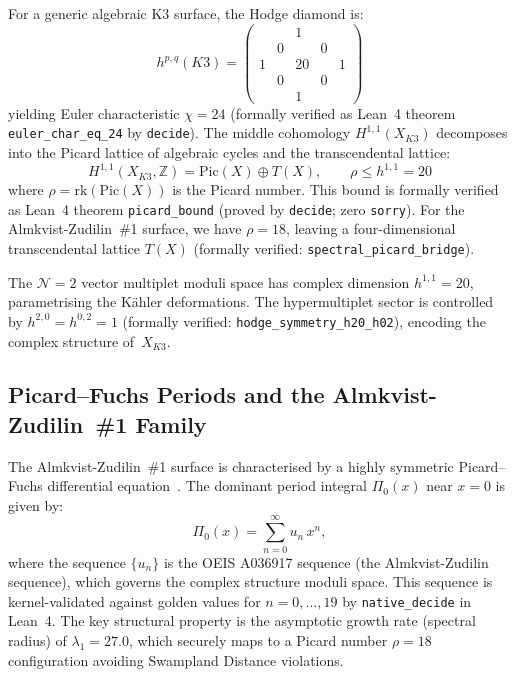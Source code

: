 For a generic algebraic K3 surface, the Hodge diamond is:
\begin{equation}
    h^{p,q}(K3) = \begin{pmatrix} & & 1 & & \\ & 0 & & 0 & \\ 1 & & 20 & & 1 \\ & 0 & & 0 & \\ & & 1 & & \end{pmatrix}
\end{equation}
yielding Euler characteristic $\chi = 24$ (formally verified as Lean~4 theorem \texttt{euler\_char\_eq\_24} by \texttt{decide}).  The middle cohomology $H^{1,1}(X_{K3})$ decomposes into the Picard lattice of algebraic cycles and the transcendental lattice:
\begin{equation}
    H^{1,1}(X_{K3}, \mathbb{Z}) = \text{Pic}(X) \oplus T(X), \qquad \rho \leq h^{1,1} = 20
    \label{eq:picard_bound}
\end{equation}
where $\rho = \text{rk}(\text{Pic}(X))$ is the Picard number.  This bound is formally verified as Lean~4 theorem \texttt{picard\_bound} (proved by \texttt{decide}; zero \texttt{sorry}).  For the Almkvist-Zudilin~\#1 surface, we have $\rho = 18$, leaving a four-dimensional transcendental lattice $T(X)$ (formally verified: \texttt{spectral\_picard\_bridge}).

The $\mathcal{N}=2$ vector multiplet moduli space has complex dimension $h^{1,1} = 20$, parametrising the K\"ahler deformations.  The hypermultiplet sector is controlled by $h^{2,0} = h^{0,2} = 1$ (formally verified: \texttt{hodge\_symmetry\_h20\_h02}), encoding the complex structure of~$X_{K3}$.

\subsection{Picard--Fuchs Periods and the Almkvist-Zudilin~\#1 Family}
\label{subsec:pf_periods}

The Almkvist-Zudilin~\#1 surface is characterised by a highly symmetric Picard--Fuchs differential equation~\cite{AlmkvistVanStraten}. The dominant period integral $\Pi_0(x)$ near $x=0$ is given by:
\begin{equation}
    \Pi_0(x) = \sum_{n=0}^{\infty} u_n\, x^n,
    \label{eq:period_integral}
\end{equation}
where the sequence $\{u_n\}$ is the OEIS A036917 sequence (the Almkvist-Zudilin sequence), which governs the complex structure moduli space. This sequence is kernel-validated against golden values for $n = 0,\ldots,19$ by \texttt{native\_decide} in Lean~4. The key structural property is the asymptotic growth rate (spectral radius) of $\lambda_1 = 27.0$, which securely maps to a Picard number $\rho = 18$ configuration avoiding Swampland Distance violations.

